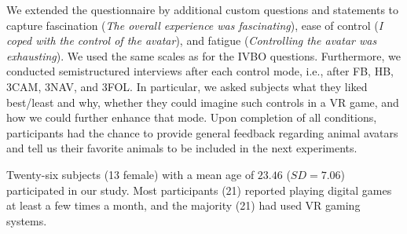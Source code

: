 \documentclass[conference]{IEEEtran}
\begin{document}
%
%
%
%


We extended the questionnaire by additional custom questions and statements to capture fascination (\textit{The overall experience was fascinating}), ease of control (\textit{I coped with the control of the avatar}), and fatigue (\textit{Controlling the avatar was exhausting}). We used the same scales as for the IVBO questions. Furthermore, we conducted semistructured interviews after each control mode, i.e., after FB, HB, 3CAM, 3NAV, and 3FOL. In particular, we asked subjects what they liked best/least and why, whether they could imagine such controls in a VR game, and how we could further enhance that mode. Upon completion of all conditions, participants had the chance to provide general feedback regarding animal avatars and tell us their favorite animals to be included in the next experiments.






Twenty-six subjects (13 female) with a mean age of $23.46$ ($SD=7.06$) participated in our study. Most participants (21) reported playing digital games at least a few times a month, and the majority (21) had used VR gaming systems. 
\end{document}
